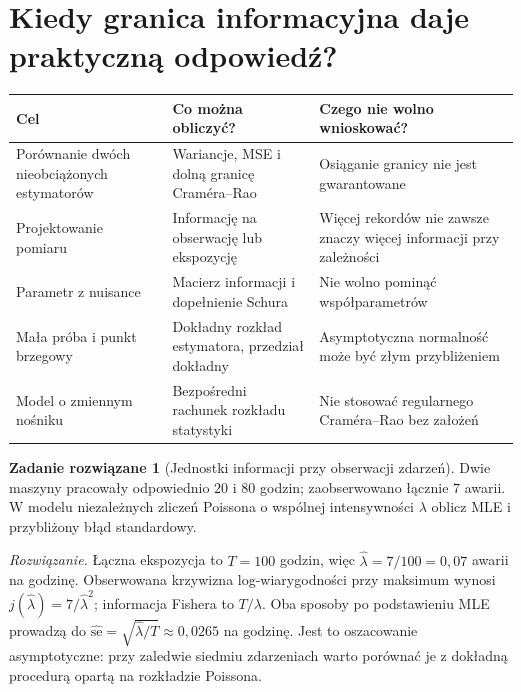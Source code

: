 \documentclass[11pt,a4paper,oneside]{report}
\numberwithin{equation}{chapter}
\theoremstyle{plain}
\theoremstyle{definition}
\newtheorem{zadanie}{Zadanie rozwiązane}[chapter]
\theoremstyle{remark}
\begin{document}
\section{Kiedy granica informacyjna daje praktyczną odpowiedź?}
\begin{center}\small
\begin{tabular}{>{\raggedright\arraybackslash}p{}>{\raggedright\arraybackslash}p{}>{\raggedright\arraybackslash}p{}}
\toprule
\textbf{Cel} & \textbf{Co można obliczyć?} & \textbf{Czego nie wolno wnioskować?}\\
\midrule
Porównanie dwóch nieobciążonych estymatorów & Wariancje, MSE i dolną granicę Craméra--Rao & Osiąganie granicy nie jest gwarantowane\\
Projektowanie pomiaru & Informację na obserwację lub ekspozycję & Więcej rekordów nie zawsze znaczy więcej informacji przy zależności\\
Parametr z nuisance & Macierz informacji i dopełnienie Schura & Nie wolno pominąć współparametrów\\
Mała próba i punkt brzegowy & Dokładny rozkład estymatora, przedział dokładny & Asymptotyczna normalność może być złym przybliżeniem\\
Model o zmiennym nośniku & Bezpośredni rachunek rozkładu statystyki & Nie stosować regularnego Craméra--Rao bez założeń\\
\bottomrule
\end{tabular}
\end{center}

\begin{zadanie}[Jednostki informacji przy obserwacji zdarzeń]
Dwie maszyny pracowały odpowiednio $20$ i $80$ godzin;
zaobserwowano łącznie $7$ awarii. W modelu niezależnych zliczeń
Poissona o wspólnej intensywności $\lambda$ oblicz MLE i
przybliżony błąd standardowy.
\par\emph{Rozwiązanie.} Łączna ekspozycja to $T=100$ godzin,
więc $\widehat\lambda=7/100=0{,}07$ awarii na godzinę.
Obserwowana krzywizna log-wiarygodności przy maksimum wynosi
$j(\widehat\lambda)=7/\widehat\lambda^2$;
informacja Fishera to $T/\lambda$.
Oba sposoby po podstawieniu MLE prowadzą do
$\widehat{\mathrm{se}}=\sqrt{\widehat\lambda/T}
\approx0{,}0265$ na godzinę. Jest to oszacowanie asymptotyczne:
przy zaledwie siedmiu zdarzeniach warto porównać je z dokładną
procedurą opartą na rozkładzie Poissona.
\end{zadanie}

\end{document}
